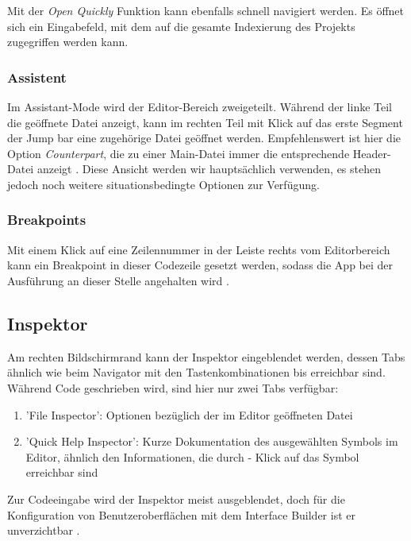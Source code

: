 \documentclass[parskip=half, final]{scrreprt}
\begin{document}
Mit der \emph{Open Quickly} Funktion  kann ebenfalls schnell navigiert werden. Es öffnet sich ein Eingabefeld, mit dem auf die gesamte Indexierung des Projekts zugegriffen werden kann.

\subsubsection{Assistent}

Im Assistant-Mode wird der Editor-Bereich zweigeteilt. Während der linke Teil die geöffnete Datei anzeigt, kann im rechten Teil mit Klick auf das erste Segment der Jump bar eine zugehörige Datei geöffnet werden. Empfehlenswert ist hier die Option \emph{Counterpart}, die zu einer Main-Datei immer die entsprechende Header-Datei anzeigt . Diese Ansicht werden wir hauptsächlich verwenden, es stehen jedoch noch weitere situationsbedingte Optionen zur Verfügung.

\subsubsection{Breakpoints}\label{sec:breakpoints}

Mit einem Klick auf eine Zeilennummer in der Leiste rechts vom Editorbereich kann ein Breakpoint in dieser Codezeile gesetzt werden, sodass die App bei der Ausführung an dieser Stelle angehalten wird .

\subsection{Inspektor}\label{sec:inspektor}

Am rechten Bildschirmrand kann der Inspektor eingeblendet werden, dessen Tabs ähnlich wie beim Navigator mit den Tastenkombinationen  bis  erreichbar sind. Während Code geschrieben wird, sind hier nur zwei Tabs verfügbar:
\begin{enumerate}
\item 'File Inspector': Optionen bezüglich der im Editor geöffneten Datei
\item 'Quick Help Inspector': Kurze Dokumentation des ausgewählten Symbols im Editor, ähnlich den Informationen, die durch \keysc{\altkey} - Klick auf das Symbol erreichbar sind
\end{enumerate}
Zur Codeeingabe wird der Inspektor meist ausgeblendet, doch für die Konfiguration von Benutzeroberflächen mit dem Interface Builder ist er unverzichtbar .
\end{document}
